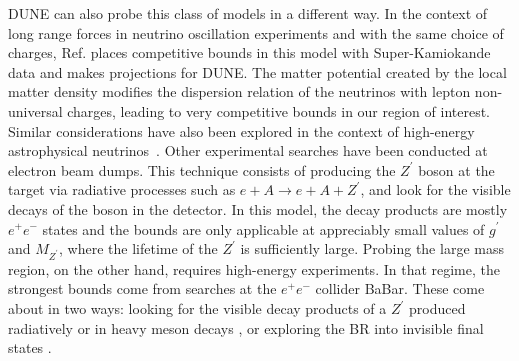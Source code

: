DUNE can also probe this class of models in a different way. In the context of long range forces in neutrino oscillation experiments and with the same choice of charges, Ref. \cite{Wise:2018rnb} places competitive bounds in this model with Super-Kamiokande data and makes projections for DUNE. The matter potential created by the local matter density modifies the dispersion relation of the neutrinos with lepton non-universal charges, leading to very competitive bounds in our region of interest. Similar considerations have also been explored in the context of high-energy astrophysical neutrinos~\cite{Bustamante:2018mzu}. Other experimental searches have been conducted at electron beam dumps. This technique consists of producing the $Z^\prime$ boson at the target via radiative processes such as $e + A \to e + A + Z^\prime$, and look for the visible decays of the boson in the detector. In this model, the decay products are mostly $e^+ e^-$ states and the bounds are only applicable at appreciably small values of $g^\prime$ and $M_{Z^\prime}$, where the lifetime of the $Z^\prime$ is sufficiently large. Probing the large mass region, on the other hand, requires high-energy experiments. In that regime, the strongest bounds come from searches at the $e^+ e^-$ collider BaBar. These come about in two ways: looking for the visible decay products of a $Z^\prime$ produced radiatively or in heavy meson decays \cite{Lees:2014xha}, or exploring the BR into invisible final states \cite{Lees:2017lec}.
%
